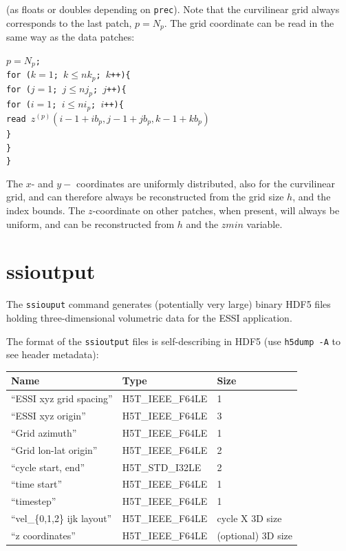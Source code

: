 \documentclass[11pt]{report}
\begin{document}
(as floats or doubles depending on {\tt prec}). Note that the curvilinear grid always
corresponds to the last patch, $p=N_p$. The grid coordinate can be read in the same way as
the data patches:
\begin{flushleft}
{\tt $p=N_p$;\\
for ($k=1$; $k\leq nk_p$; $k$++)\{\\
\hspace{5mm}for ($j=1$; $j\leq nj_p$; $j$++)\{\\
\hspace{10mm}for ($i=1$; $i\leq ni_p$; $i$++)\{\\
\hspace{15mm}read $z^{(p)}(i-1+ib_p, j-1+jb_p,k-1+kb_p)$\\
\hspace{10mm}\}\\
\hspace{5mm}\}\\
\}}
\end{flushleft}
The $x$- and $y-$ coordinates are uniformly distributed, also for the curvilinear grid, and can therefore always be
reconstructed from the grid size $h$, and the index bounds. The $z$-coordinate on other patches, when present, will
always be uniform, and can be reconstructed from $h$ and the $zmin$ variable.

\section{ssioutput}\label{sec:ssioutput-format}

The \verb+ssiouput+ command generates (potentially very large) binary HDF5
  files holding three-dimensional volumetric data for the ESSI application.

The format of the \verb+ssioutput+ files is self-describing in HDF5
  (use {\tt h5dump -A} to see header metadata):
\begin{center}
\begin{tabular}{lll}\hline
Name & Type & Size \\ \hline
  ``ESSI xyz grid spacing'' & H5T\_IEEE\_F64LE & 1 \\ \hline
  ``ESSI xyz origin'' & H5T\_IEEE\_F64LE & 3 \\ \hline
  ``Grid azimuth'' & H5T\_IEEE\_F64LE & 1 \\ \hline
  ``Grid lon-lat origin'' & H5T\_IEEE\_F64LE & 2 \\ \hline
  ``cycle start, end'' & H5T\_STD\_I32LE & 2 \\ \hline
  ``time start'' & H5T\_IEEE\_F64LE & 1 \\ \hline
  ``timestep'' & H5T\_IEEE\_F64LE & 1 \\ \hline
  ``vel\_\{0,1,2\} ijk layout'' & H5T\_IEEE\_F64LE & cycle X 3D size \\ \hline
  ``z coordinates'' & H5T\_IEEE\_F64LE & (optional) 3D size \\ \hline
\end{tabular}
\end{center}
\end{document}
